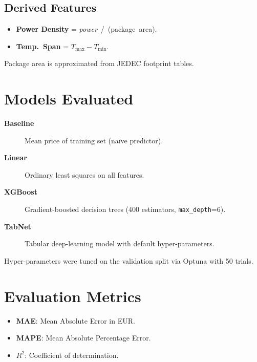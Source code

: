\subsection{Derived Features}
\begin{itemize}
  \item \textbf{Power Density} = \textit{power}~\slash~(package~area).
  \item \textbf{Temp.~Span}   = $T_{\max}-T_{\min}$.
\end{itemize}
Package area is approximated from JEDEC footprint tables.

\section{Models Evaluated}
\begin{description}
  \item[\textbf{Baseline}] Mean price of training set (naïve predictor).
  \item[\textbf{Linear}] Ordinary least squares on all features.
  \item[\textbf{XGBoost}] Gradient-boosted decision trees (400 estimators, \texttt{max\_depth}=6).
  \item[\textbf{TabNet}] Tabular deep-learning model with default hyper-parameters.
\end{description}
Hyper-parameters were tuned on the validation split via Optuna with 50 trials.

\section{Evaluation Metrics}
\begin{itemize}
  \item \textbf{MAE}: Mean Absolute Error in EUR.
  \item \textbf{MAPE}: Mean Absolute Percentage Error.
  \item \textbf{$R^{2}$}: Coefficient of determination.
\end{itemize}

